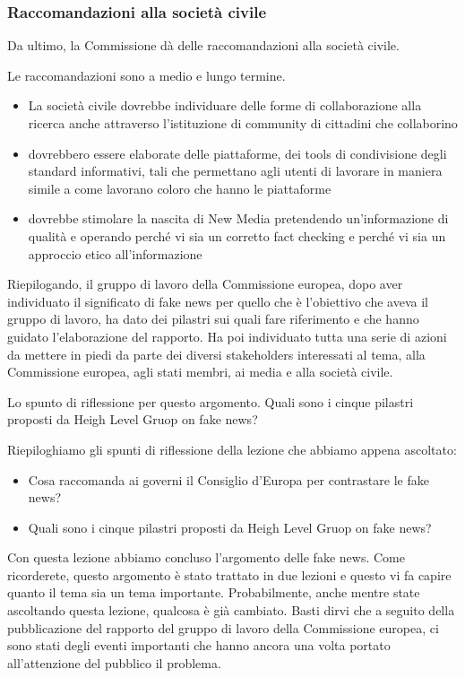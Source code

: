 \subsubsection{Raccomandazioni alla società civile}
Da ultimo, la Commissione dà delle raccomandazioni alla società civile.\par
Le raccomandazioni sono  a medio e lungo termine. 

\begin{itemize}
    \item La società civile dovrebbe individuare delle forme di collaborazione alla ricerca anche attraverso l'istituzione di community di cittadini che collaborino
    \item dovrebbero essere elaborate delle piattaforme, dei tools di condivisione degli standard informativi, tali che permettano agli utenti di lavorare in maniera simile a come lavorano coloro che hanno le piattaforme
    \item dovrebbe stimolare la nascita di New Media pretendendo un'informazione di qualità e operando perché vi sia un corretto fact checking e perché vi sia un approccio etico all'informazione
    
\end{itemize}

Riepilogando, il gruppo di lavoro della Commissione europea, dopo aver individuato il significato di fake news per quello che è l'obiettivo che aveva il gruppo di lavoro, ha dato dei pilastri sui quali fare riferimento e che hanno guidato l'elaborazione del rapporto. Ha poi individuato tutta una serie di azioni da mettere in piedi da parte dei diversi stakeholders interessati al tema, alla Commissione europea, agli stati membri, ai media e alla società civile.

Lo spunto di riflessione per questo argomento. Quali sono i cinque pilastri proposti da Heigh Level Gruop on fake news?

Riepiloghiamo gli spunti di riflessione della lezione che abbiamo appena ascoltato:

\begin{itemize}
    \item Cosa raccomanda ai governi il Consiglio d'Europa per contrastare le fake news?
    \item Quali sono i cinque pilastri proposti da Heigh Level Gruop on fake news?
\end{itemize}

Con questa lezione abbiamo concluso l'argomento delle fake news. 
Come ricorderete, questo argomento è stato trattato in due lezioni e questo vi fa capire quanto il tema sia un tema importante. Probabilmente, anche mentre state ascoltando questa lezione, qualcosa è già cambiato. Basti dirvi che a seguito della pubblicazione del rapporto del gruppo di lavoro della Commissione europea, ci sono stati degli eventi importanti che hanno ancora una volta portato all'attenzione del pubblico il problema.

